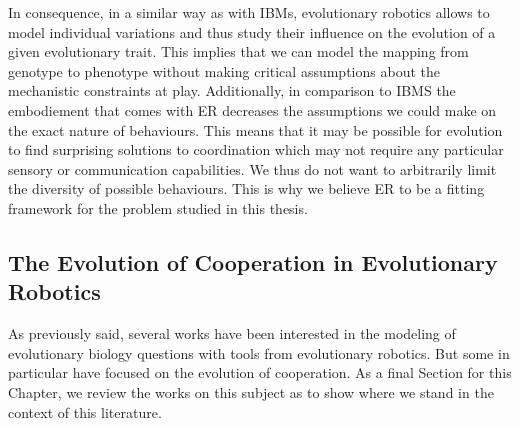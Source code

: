         In consequence, in a similar way as with IBMs, evolutionary robotics allows to model individual variations and thus study their influence on the evolution of a given evolutionary trait. This implies that we can model the mapping from genotype to phenotype without making critical assumptions about the mechanistic constraints at play. Additionally, in comparison to IBMS the embodiement that comes with ER decreases the assumptions we could make on the exact nature of behaviours. This means that it may be possible for evolution to find surprising solutions to coordination which may not require any particular sensory or communication capabilities. We thus do not want to arbitrarily limit the diversity of possible behaviours. This is why we believe ER to be a fitting framework for the problem studied in this thesis.


    \subsection{The Evolution of Cooperation in Evolutionary Robotics}

        As previously said, several works have been interested in the modeling of evolutionary biology questions with tools from evolutionary robotics. But some in particular have focused on the evolution of cooperation. As a final Section for this Chapter, we review the works on this subject as to show where we stand in the context of this literature.

